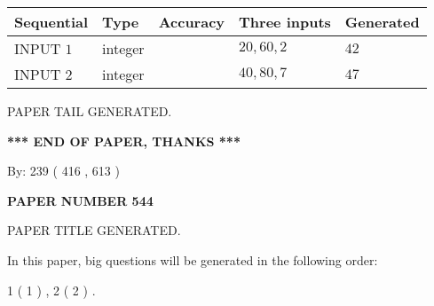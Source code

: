 \documentclass[12pt]{article}
\begin{document}
   
  
  
\noindent\begin{tabular}{|l|l|l|l|l|}
\hline
 Sequential & Type & Accuracy & Three inputs & Generated \\ 
\hline
 
 
  INPUT $  1 $ & integer &  & $
 20
 , 
 60
 , 
 2
 $ & $ 42 $ 
 \\  \hline  
 
 
  INPUT $  2 $ & integer &  & $
 40
 , 
 80
 , 
 7
 $ & $ 47 $ 
 \\  \hline  
 \end{tabular}
   
   
   
   
   
   
 \vspace{0.2in}
 
   
   
\vspace{2.0in} PAPER TAIL GENERATED.
   
   
   
   
\vspace{1.0in} 
{\textbf{\large{ *** END OF PAPER, THANKS *** }}} 
   
   
\hspace{1.0in} By: 
 239 ( 416 ,  613 )
   
   
   
   
\newpage 
\setcounter{page}{ 
   544001 } 
   
   
   
   
 {\textbf{ \Large{ PAPER NUMBER  544  }}}
   
   
\vspace{0.2in}
   
   
   
   
   
   
   
   
 \vspace{0.2in}
 
 
 
 
   
   
 PAPER TITLE GENERATED.
   
   
   
\vspace{0.2in}
   
In this paper, big questions will be generated in the following order: 
   
   
   1 ( 1 )
 ,
   2 ( 2 )
 .
  
\end{document}
